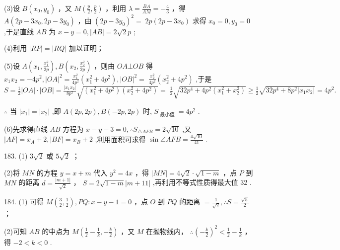 \documentclass[10pt]{article}
\begin{document}
(3)设 \(B\left( {{x}_{0},{y}_{0}}\right)\) ，又 \(M\left( {\frac{p}{2},\frac{p}{2}}\right)\) ，利用 \(\lambda  = \frac{BA}{AM} =  - \frac{4}{3}\) ，得 \(A\left( {{2p} - 3{x}_{0},{2p} - 3{y}_{0}}\right)\) ，由 \({\left( 2p - 3{y}_{0}\right) }^{2} = \; {2p}\left( {{2p} - 3{x}_{0}}\right)\) 求得 \({x}_{0} = 0,{y}_{0} = 0\) ,于是直线 \({AB}\) 为 \(x - y = 0,\left| {AB}\right|  = 2\sqrt{2}p\) ;

(4)利用 \(\left| {RP}\right|  = \left| {RQ}\right|\) 加以证明；

(5)设 \(A\left( {{x}_{1},\frac{{x}_{1}^{2}}{2p}}\right) ,B\left( {{x}_{2},\frac{{x}_{2}^{2}}{2p}}\right)\) ，则由 \({OA} \bot  {OB}\) 得 \({x}_{1}{x}_{2} =  - 4{p}^{2},{\left| OA\right| }^{2} = \frac{{x}_{1}^{2}}{4{p}^{2}}\left( {{x}_{1}^{2} + 4{p}^{2}}\right) ,{\left| OB\right| }^{2} = \; \frac{{x}_{2}^{2}}{4{p}^{2}}\left( {{x}_{2}^{2} + 4{p}^{2}}\right)\) ,于是 \(S = \frac{1}{2}\left| {OA}\right|  \cdot  \left| {OB}\right|  = \frac{\left| {x}_{1}{x}_{2}\right| }{8{p}^{2}}\sqrt{\left( {{x}_{1}^{2} + 4{p}^{2}}\right) \left( {{x}_{2}^{2} + 4{p}^{2}}\right) } = \; \frac{1}{2}\sqrt{{32}{p}^{4} + 4{p}^{2}\left( {{x}_{1}^{2} + {x}_{2}^{2}}\right) } \geq  \frac{1}{2}\sqrt{{32}{p}^{4} + 8{p}^{2}\left| {{x}_{1}{x}_{2}}\right| } = 4{p}^{2}.\)

\(\therefore\) 当 \(\left| {x}_{1}\right|  = \left| {x}_{2}\right|\) ,即 \(A\left( {{2p},{2p}}\right) ,B\left( {-{2p},{2p}}\right)\) 时, \({S}_{\text{ 最小值 }} = 4{p}^{2}\) .

(6)先求得直线 \({AB}\) 方程为 \(x - y - 3 = 0,\therefore {S}_{\bigtriangleup {AFB}} = 2\sqrt{10}\) ,又 \(\left| {AF}\right|  = {x}_{A} + 2,\left| {BF}\right|  = {x}_{B} + 2\) ,利用面积可求得 \(\sin \angle {AFB} = \frac{4\sqrt{10}}{41}\) .

183. (1) \(3\sqrt{2}\) 或 \(5\sqrt{2}\) ；

(2)将 \({MN}\) 的方程 \(y = x + m\) 代入 \({y}^{2} = {4x}\) ，得 \(\left| {MN}\right|  = {4\sqrt{2}} \cdot  \sqrt{1 - m}\) ，点 \(P\) 到 \({MN}\) 的距离 \(d = \frac{\left| m + 1\right| }{\sqrt{2}}\) ， \(S = 2\sqrt{1 - m}\left| {m + {11}}\right|\) ,再利用不等式性质得最大值 32 .

184. (1) 可得 \(M\left( {\frac{3}{2},\frac{1}{2}}\right) ,{PQ} : x - y - 1 = 0\) ，点 \(O\) 到 \({PQ}\) 的距离 \(= \frac{1}{\sqrt{2}},\therefore S = \frac{\sqrt{5}}{2}\) ；

(2)可知 \({AB}\) 的中点为 \(M\left( {\frac{1}{2} - \frac{1}{k}, - \frac{k}{2}}\right)\) ，又 \(M\) 在抛物线内， \(\therefore {\left( -\frac{k}{2}\right) }^{2} < \frac{1}{2} - \frac{1}{k}\) ，得 \(- 2 < k < 0\) .
\end{document}
